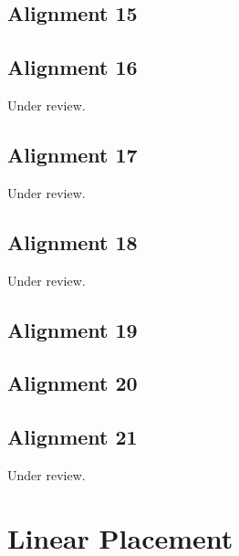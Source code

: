 \documentclass{scrartcl}
\begin{document}
\subsection{Alignment 15} %
\label{sec:align_15}
\clearpage

\subsection{Alignment 16} %
\label{sec:align_16}
Under review.%
\clearpage

\subsection{Alignment 17} %
\label{sec:align_17}
Under review.%
\clearpage

\subsection{Alignment 18} %
\label{sec:align_18}
Under review.%
\clearpage

\subsection{Alignment 19} %
\label{sec:align_19}
\clearpage

\subsection{Alignment 20} %
\label{sec:align_20}
\clearpage

\subsection{Alignment 21} %
\label{sec:align_21}
Under review.%
\clearpage

\section{Linear Placement}
\label{sec:linear_placement}
\end{document}
